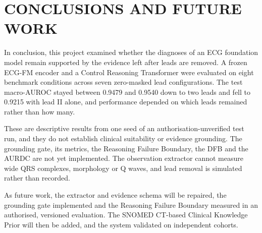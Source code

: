 
\chapter{CONCLUSIONS AND FUTURE WORK}
\label{chap:ch6}

In conclusion, this project examined whether the diagnoses of an ECG foundation model remain supported by the evidence left after leads are removed. A frozen ECG-FM encoder \cite{MCKEEN2025ECGFM} and a Control Reasoning Transformer were evaluated on eight benchmark conditions across seven zero-masked lead configurations. The test macro-AUROC stayed between 0.9479 and 0.9540 down to two leads and fell to 0.9215 with lead II alone, and performance depended on which leads remained rather than how many.

These are descriptive results from one seed of an authorisation-unverified test run, and they do not establish clinical suitability or evidence grounding. The grounding gate, its metrics, the Reasoning Failure Boundary, the DFB and the AURDC are not yet implemented. The observation extractor cannot measure wide QRS complexes, morphology or Q waves, and lead removal is simulated rather than recorded.

As future work, the extractor and evidence schema will be repaired, the grounding gate implemented and the Reasoning Failure Boundary measured in an authorised, versioned evaluation. The SNOMED CT-based Clinical Knowledge Prior \cite{SNOMED2026CDSGUIDE} will then be added, and the system validated on independent cohorts.
